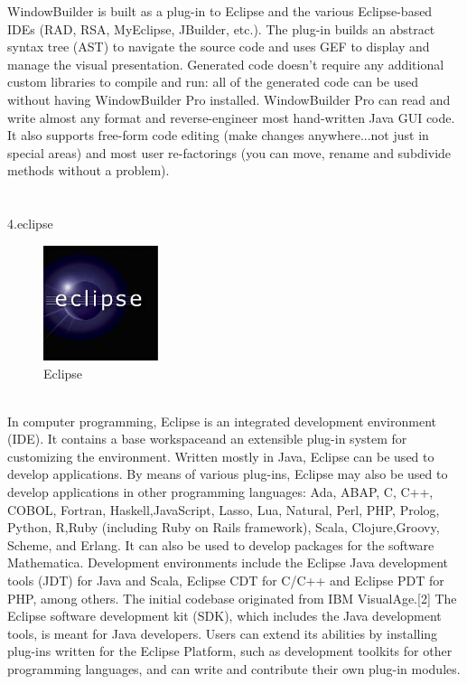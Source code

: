 \documentclass[a4paper,11pt]{IEEEtran}
\begin{document}
{WindowBuilder is built as a plug-in to Eclipse and the various Eclipse-based IDEs (RAD, RSA, MyEclipse, JBuilder, etc.). The plug-in builds an abstract syntax tree (AST) to navigate the source code and uses GEF to display and manage the visual presentation.
Generated code doesn't require any additional custom libraries to compile and run: all of the generated code can be used without having WindowBuilder Pro installed. WindowBuilder Pro can read and write almost any format and reverse-engineer most hand-written Java GUI code. It also supports free-form code editing (make changes anywhere...not just in special areas) and most user re-factorings (you can move, rename and subdivide methods without a problem).
~\\
~\\~\\
4.eclipse
~\\
\begin{figure}[!h]
        \centering
        \includegraphics[width=0.3\textwidth]{eclipse.jpg}
        \caption{Eclipse}
        \label{fig1}
\end{figure}
~\\
In computer programming, Eclipse is an integrated development environment (IDE). It contains a base workspaceand an extensible plug-in system for customizing the environment. Written mostly in Java, Eclipse can be used to develop applications. By means of various plug-ins, Eclipse may also be used to develop applications in other programming languages: Ada, ABAP, C, C++, COBOL, Fortran, Haskell,JavaScript, Lasso, Lua, Natural, Perl, PHP, Prolog, Python, R,Ruby (including Ruby on Rails framework), Scala, Clojure,Groovy, Scheme, and Erlang. It can also be used to develop packages for the software Mathematica. Development environments include the Eclipse Java development tools (JDT) for Java and Scala, Eclipse CDT for C/C++ and Eclipse PDT for PHP, among others.
The initial codebase originated from IBM VisualAge.[2] The Eclipse software development kit (SDK), which includes the Java development tools, is meant for Java developers. Users can extend its abilities by installing plug-ins written for the Eclipse Platform, such as development toolkits for other programming languages, and can write and contribute their own plug-in modules.
}
\end{document}
